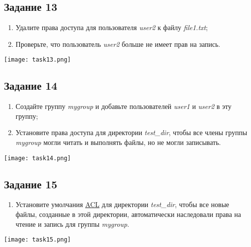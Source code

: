 \documentclass[12pt, a4paper]{report}
\begin{document}
	\subsection*{Задание 13}
	\begin{enumerate}
		\item Удалите права доступа для пользователя \textit{user2} к файлу \textit{file1.txt};
		\item Проверьте, что пользователь \textit{user2} больше не имеет прав на запись.
	\end{enumerate}
	\lstset{style=mystyle}
	
	\begin{center}
		\texttt{[image: task13.png]}
	\end{center}

	\subsection*{Задание 14}
	\begin{enumerate}
		\item Создайте группу \textit{mygroup} и добавьте пользователей \textit{user1} и \textit{user2} в эту группу;
		\item Установите права доступа для директории \textit{test\_dir}, чтобы все члены группы \textit{mygroup} могли читать и выполнять файлы, но не могли записывать.
	\end{enumerate}
	\lstset{style=mystyle}
	
	\begin{center}
		\texttt{[image: task14.png]}
	\end{center}

	\subsection*{Задание 15}
	\begin{enumerate}
		\item Установите умолчания \underline{ACL} для директории \textit{test\_dir}, чтобы все новые файлы, созданные в этой директории, автоматически наследовали права на чтение и запись для группы \textit{mygroup}.
	\end{enumerate}
	\lstset{style=mystyle}
	
	\begin{center}
		\texttt{[image: task15.png]}
	\end{center}
\end{document}
